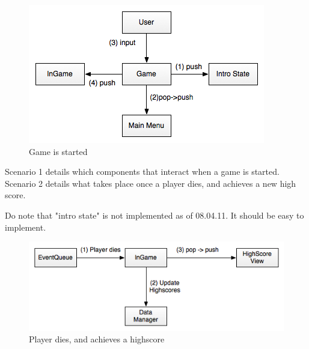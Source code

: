 \begin{figure}[H]
	\begin{center}
		\includegraphics[scale=0.75]{graphics/scenario_1_StartingGame}
	\end{center}
        \caption{Game is started}
\end{figure}

Scenario 1 details which components that interact when a game is started. Scenario
2 details what takes place once a player dies, and achieves a new high score. 

Do note that "intro state" is not implemented as of 08.04.11. It should be easy to 
implement. 

\begin{figure}[H]
	\begin{center}
		\includegraphics[scale=0.75]{graphics/scenario_2_PlayerDiesHighScore}
	\end{center}
        \caption{Player dies, and achieves a highscore}
\end{figure}
